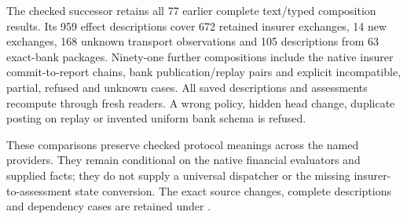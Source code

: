 The checked successor retains all 77 earlier complete text/typed composition
results. Its 959 effect descriptions cover 672 retained insurer exchanges,
14 new exchanges, 168 unknown transport observations and 105 descriptions from
63 exact-bank packages. Ninety-one further compositions include the native
insurer commit-to-report chains, bank publication/replay pairs and explicit
incompatible, partial, refused and unknown cases. All saved descriptions and
assessments recompute through fresh readers. A wrong policy, hidden head change,
duplicate posting on replay or invented uniform bank schema is refused.

These comparisons preserve checked protocol meanings across the named
providers. They remain conditional on the native financial evaluators and
supplied facts; they do not supply a universal dispatcher or the missing
insurer-to-assessment state conversion. The exact source changes, complete
descriptions and dependency cases are retained under
.
